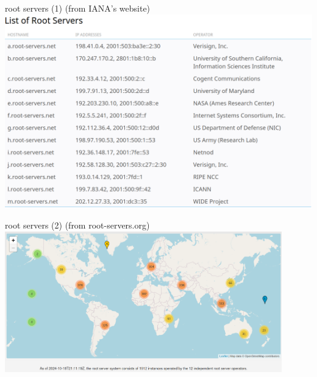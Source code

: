 \begin{frame}{root servers (1)}
(from IANA's website)
\includegraphics[height=0.8\textheight]{../dns/iana-root-server-list}
\end{frame}

\begin{frame}{root servers (2)}
(from root-servers.org)
\includegraphics[width=0.9\textwidth]{../dns/root-servers-map}
\end{frame}

